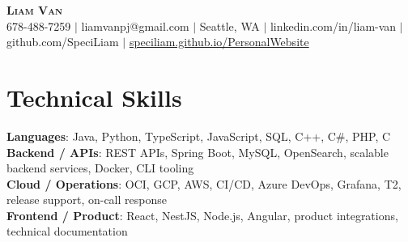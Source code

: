 \documentclass[letterpaper,11pt]{article}
\begin{document}

%
\begin{center}
    \textbf{\Huge \scshape Liam Van} \\ \vspace{1pt}
    \small 678-488-7259 $|$ \small {liamvanpj@gmail.com} $|$ Seattle, WA
 {{$|$ linkedin.com/in/liam-van} {$|$ github.com/SpeciLiam} {$|$ \href{https://speciliam.github.io/PersonalWebsite}{speciliam.github.io/PersonalWebsite}}}

\end{center}

\section{Technical Skills}
 \begin{itemize}[leftmargin=0.15in, label={}]
    \small{\item{
     \textbf{Languages}{: Java, Python, TypeScript, JavaScript, SQL, C++, C\#, PHP, C} \\
     \textbf{Backend / APIs}{: REST APIs, Spring Boot, MySQL, OpenSearch, scalable backend services, Docker, CLI tooling} \\
     \textbf{Cloud / Operations}{: OCI, GCP, AWS, CI/CD, Azure DevOps, Grafana, T2, release support, on-call response} \\
     \textbf{Frontend / Product}{: React, NestJS, Node.js, Angular, product integrations, technical documentation} \\
    }}
 \end{itemize}
%
\end{document}
